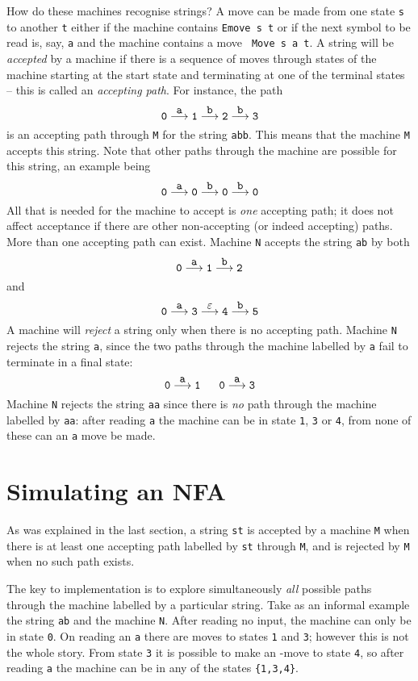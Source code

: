 \documentclass[11pt]{article}
\begin{document}
How do these machines recognise strings? A move can be made from one state
{\tt s} to another {\tt t} either
if the machine contains {\tt Emove s t} or if the
next symbol to be read is, say, {\tt a} and the machine contains a move {\tt
Move s a t}.
A string will be {\em accepted\/} by a machine if there is a sequence of moves
through states of the machine starting at the start state and terminating at
one of the terminal states -- this is called an {\em accepting path}.
For instance, the path
\[
\tt
0 \stackrel{\mbox{\tt a}}{\longrightarrow} 1 \stackrel{\mbox{\tt b}}{\longrightarrow} 2 \stackrel{\mbox{\tt b}}{\longrightarrow} 3
\]
is an accepting path through {\tt M} for the string {\tt abb}. This means that
the machine {\tt M} accepts this string. Note that other paths through the
machine are possible for this string, an example being
\[
\tt
0 \stackrel{\mbox{\tt a}}{\longrightarrow} 0 \stackrel{\mbox{\tt b}}{\longrightarrow} 0 \stackrel{\mbox{\tt b}}{\longrightarrow} 0
\]
All that is needed for the machine to accept is {\em one\/} accepting path; it
does not affect acceptance if there are other non-accepting (or indeed
accepting) paths. More than one accepting path can exist. Machine {\tt N}
accepts the string {\tt ab} by both
\[
\tt
0 \stackrel{\mbox{\tt a}}{\longrightarrow} 1 \stackrel{\mbox{\tt b}}{\longrightarrow} 2
\]
and 
\[
\tt
0 \stackrel{\mbox{\tt a}}{\longrightarrow} 3 \stackrel{\mbox{\tt $\varepsilon$}}{\longrightarrow} 4 \stackrel{\mbox{\tt b}}{\longrightarrow} 5
\]
A machine will {\em reject\/} a string only when there is no accepting path.
Machine {\tt N} rejects the string {\tt a}, since the two paths through the
machine labelled by {\tt a} fail to terminate in a final state:
\[
\tt
0 \stackrel{\mbox{\tt a}}{\longrightarrow} 1 \;\;\;\;\;\; 0 \stackrel{\mbox{\tt a}}{\longrightarrow} 3
\]
Machine {\tt N} rejects the string {\tt aa}
since there is {\em no\/} path through the machine labelled by {\tt aa}: after
reading {\tt a} the machine can be in state {\tt 1}, {\tt 3}
or {\tt 4}, from none
of these can an {\tt a} move be made.

\section{Simulating an NFA}
\label{implem}

As was explained in the last section, a string {\tt st} is accepted by a
machine {\tt M} when there is at least one accepting path labelled by {\tt st}
through {\tt M}, and is rejected by {\tt M} when no such path exists. 

The key to implementation is to explore simultaneously {\em all\/} possible
paths through the machine labelled by a particular string. Take as an informal
example the string {\tt ab} and the machine {\tt N}. After reading no input,
the machine can only be in state {\tt 0}. On reading an {\tt a} there are
moves to states {\tt 1} and {\tt 3}; however this is not the whole story.
From state
{\tt 3} it is possible to make an \eps-move to state {\tt 4}, so after reading
{\tt a} the machine can be in any of the states {\tt \{1,3,4\}}. 
\end{document}
